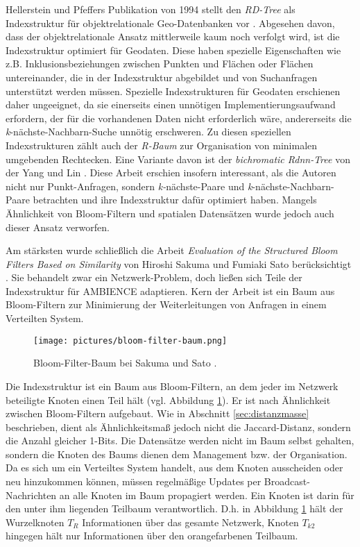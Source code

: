 Hellerstein und Pfeffers Publikation von 1994 stellt den \textit{RD-Tree} als Indexstruktur für objektrelationale Geo-Datenbanken vor \cite{Hellerstein1994}. Abgesehen davon, dass der objektrelationale Ansatz mittlerweile kaum noch verfolgt wird, ist die Indexstruktur optimiert für Geodaten. Diese haben spezielle Eigenschaften wie z.B. Inklusionsbeziehungen zwischen Punkten und Flächen oder Flächen untereinander, die in der Indexstruktur abgebildet und von Suchanfragen unterstützt werden müssen. Spezielle Indexstrukturen für Geodaten erschienen daher ungeeignet, da sie einerseits einen unnötigen Implementierungsaufwand erfordern, der für die vorhandenen Daten nicht erforderlich wäre, andererseits die \textit{k}-nächste-Nachbarn-Suche unnötig erschweren. Zu diesen speziellen Indexstrukturen zählt auch der \textit{R-Baum} zur Organisation von minimalen umgebenden Rechtecken. Eine Variante davon ist der \textit{bichromatic Rdnn-Tree} von der Yang und Lin \cite{Yang2002}. Diese Arbeit erschien insofern interessant, als die Autoren nicht nur Punkt-Anfragen, sondern \textit{k-}nächste-Paare und \textit{k}-nächste-Nachbarn-Paare betrachten und ihre Indexstruktur dafür optimiert haben. Mangels Ähnlichkeit von Bloom-Filtern und spatialen Datensätzen wurde jedoch auch dieser Ansatz verworfen. 

Am stärksten wurde schließlich die Arbeit \textit{Evaluation of the Structured Bloom Filters Based on Similarity} von Hiroshi Sakuma und Fumiaki Sato berücksichtigt \cite{Sakuma2011}. Sie behandelt zwar ein Netzwerk-Problem, doch ließen sich Teile der Indexstruktur für AMBIENCE adaptieren. Kern der Arbeit ist ein Baum aus Bloom-Filtern zur Minimierung der Weiterleitungen von Anfragen in einem Verteilten System. 
\begin{figure}[hpbt]
  \centering
  \texttt{[image: pictures/bloom-filter-baum.png]}\\
  \caption[Bloom-Filter-Baum bei Sakuma und Sato]{Bloom-Filter-Baum bei Sakuma und Sato \cite{Sakuma2011}.}\label{fig:pic5}
\end{figure}
Die Indexstruktur ist ein Baum aus Bloom-Filtern, an dem jeder im Netzwerk beteiligte Knoten einen Teil hält (vgl. Abbildung \ref{fig:pic5}). Er ist nach Ähnlichkeit zwischen Bloom-Filtern aufgebaut. Wie in Abschnitt \ref{sec:distanzmasse} beschrieben, dient als Ähnlichkeitsmaß jedoch nicht die Jaccard-Distanz, sondern die Anzahl gleicher 1-Bits. Die Datensätze werden nicht im Baum selbst gehalten, sondern die Knoten des Baums dienen dem Management bzw. der Organisation. Da es sich um ein Verteiltes System handelt, aus dem Knoten ausscheiden oder neu hinzukommen können, müssen regelmäßige Updates per Broadcast-Nachrichten an alle Knoten im Baum propagiert werden. Ein Knoten ist darin für den unter ihm liegenden Teilbaum verantwortlich. D.h. in Abbildung \ref{fig:pic5} hält der Wurzelknoten $T_R$ Informationen über das gesamte Netzwerk, Knoten $T_{k2}$ hingegen hält nur Informationen über den orangefarbenen Teilbaum. 

